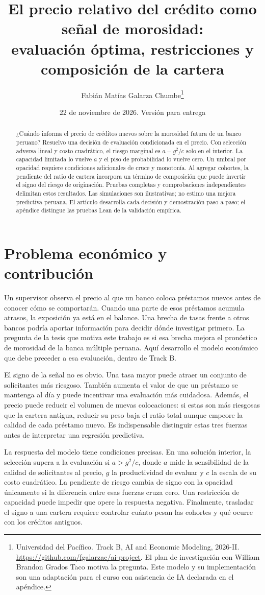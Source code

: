\documentclass[11pt]{article}
\title{El precio relativo del crédito como señal de morosidad:\\
\large evaluación óptima, restricciones y composición de la cartera}
\author{Fabián Matías Galarza Chumbe\thanks{Universidad del Pacífico.
Track B, AI and Economic Modeling, 2026-II.
\url{https://github.com/fgalarzac/ai-project}. El plan de investigación con
William Brandon Grados Taco motiva la pregunta. Este modelo y su implementación
son una adaptación para el curso con asistencia de IA declarada en el apéndice.}}
\date{22 de noviembre de 2026. Versión para entrega}
\theoremstyle{definition}\newtheorem{assumption}{Supuesto}
\begin{document}
\maketitle
\begin{abstract}
¿Cuándo informa el precio de créditos nuevos sobre la morosidad futura de un
banco peruano? Resuelvo una decisión de evaluación condicionada en el precio.
Con selección adversa lineal y costo cuadrático, el riesgo marginal es
$a-g^2/c$ solo en el interior. La capacidad limitada lo vuelve $a$ y el piso
de probabilidad lo vuelve cero. Un umbral por opacidad requiere condiciones
adicionales de cruce y monotonía. Al agregar cohortes, la pendiente del ratio
de cartera incorpora un término de composición que puede invertir el signo
del riesgo de originación. Pruebas completas y comprobaciones independientes
delimitan estos resultados. Las simulaciones son ilustrativas; no estimo una
mejora predictiva peruana. El artículo desarrolla cada decisión y demostración
paso a paso; el apéndice distingue las pruebas Lean de la validación empírica.
\end{abstract}

\section{Problema económico y contribución}
Un supervisor observa el precio al que un banco coloca préstamos nuevos antes
de conocer cómo se comportarán. Cuando una parte de esos préstamos acumula
atrasos, la exposición ya está en el balance. Una brecha de tasas frente a
otros bancos podría aportar información para decidir dónde investigar primero.
La pregunta de la tesis que motiva este trabajo es si esa brecha mejora el
pronóstico de morosidad de la banca múltiple peruana. Aquí desarrollo el
modelo económico que debe preceder a esa evaluación, dentro de Track B.

El signo de la señal no es obvio. Una tasa mayor puede atraer un conjunto de
solicitantes más riesgoso. También aumenta el valor de que un préstamo se
mantenga al día y puede incentivar una evaluación más cuidadosa. Además, el
precio puede reducir el volumen de nuevas colocaciones: si estas son más
riesgosas que la cartera antigua, reducir su peso baja el ratio total aunque
empeore la calidad de cada préstamo nuevo. Es indispensable distinguir estas
tres fuerzas antes de interpretar una regresión predictiva.

La respuesta del modelo tiene condiciones precisas. En una solución interior,
la selección supera a la evaluación si $a>g^2/c$, donde $a$ mide la sensibilidad
de la calidad de solicitantes al precio, $g$ la productividad de evaluar y $c$
la escala de su costo cuadrático. La pendiente de riesgo cambia de signo con la
opacidad únicamente si la diferencia entre esas fuerzas cruza cero. Una
restricción de capacidad puede impedir que opere la respuesta negativa.
Finalmente, trasladar el signo a una cartera requiere controlar cuánto pesan
las cohortes y qué ocurre con los créditos antiguos.
\end{document}
